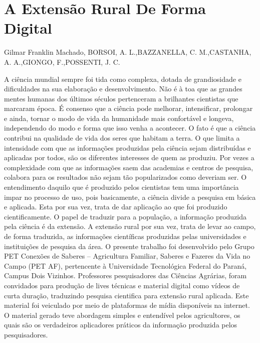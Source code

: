 


\section*{A Extensão Rural De Forma Digital }

Gilmar Franklin Machado, BORSOI, A. L.,BAZZANELLA, C. M.,CASTANHA, A. A.,GIONGO, F.,POSSENTI, J. C.

A ciência mundial sempre foi tida como complexa, dotada de grandiosidade e dificuldades
na sua elaboração e desenvolvimento. Não é à toa que as grandes mentes humanas dos últimos 
séculos pertenceram a brilhantes cientistas que marcaram época. É consenso que a ciência pode 
melhorar, intensificar, prolongar e ainda, tornar o modo de vida da humanidade mais confortável 
e longeva, independendo do modo e forma que isso venha a acontecer. 
O fato é que a ciência contribui na qualidade de vida dos seres que habitam a terra. O que 
limita a intensidade com que as informações produzidas pela ciência sejam distribuídas e aplicadas 
por todos, são os diferentes interesses de quem as produziu. Por vezes a complexidade com que as 
informações saem das academias e centros de pesquisa, colabora para os resultados não sejam tão 
popularizados como deveriam ser. O entendimento daquilo que é produzido pelos cientistas tem 
uma importância impar no processo de uso, pois basicamente, a ciência divide a pesquisa em básica 
e aplicada. Esta por sua vez, trata de dar aplicação ao que foi produzido cientificamente.
O papel de traduzir para a população, a informação produzida pela ciência é da extensão.
A extensão rural por sua vez, trata de levar ao campo, de forma traduzida, as informações 
científicas produzidas pelas universidades e instituições de pesquisa da área. O presente trabalho 
foi desenvolvido pelo Grupo PET Conexões de Saberes – Agricultura Familiar, Saberes e Fazeres 
da Vida no Campo (PET AF), pertencente à Universidade Tecnológica Federal do Paraná, Campus 
Dois Vizinhos. Professores pesquisadores das Ciências Agrárias, foram convidados para produção 
de lives técnicas e material digital como vídeos de curta duração, traduzindo pesquisa cientifica 
para extensão rural aplicada. Este material foi veiculado por meio de plataformas de mídia 
disponíveis na internet. O material gerado teve abordagem simples e entendível pelos agricultores, 
os quais são os verdadeiros aplicadores práticos da informação produzida pelos pesquisadores. 

